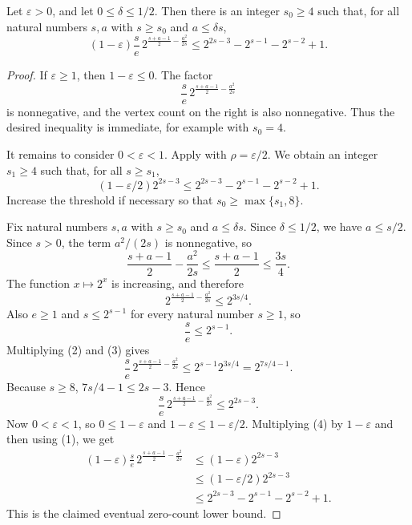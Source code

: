 \begin{helper}
Let \(\varepsilon>0\), and let \(0\le\delta\le1/2\).  Then there is an
integer \(s_0\ge4\) such that, for all natural numbers \(s,a\) with
\(s\ge s_0\) and \(a\le\delta s\),
\[
  (1-\varepsilon)\frac{s}{e}\,
  2^{\frac{s+a-1}{2}-\frac{a^2}{2s}}
  \le
  2^{2s-3}-2^{s-1}-2^{s-2}+1.
\]
\end{helper}
\begin{proof}
If \(\varepsilon\ge1\), then \(1-\varepsilon\le0\).  The factor
\[
  \frac{s}{e}\,
  2^{\frac{s+a-1}{2}-\frac{a^2}{2s}}
\]
is nonnegative, and the vertex count on the right is also nonnegative.  Thus
the desired inequality is immediate, for example with \(s_0=4\).

It remains to consider \(0<\varepsilon<1\).  Apply
 with
\(\rho=\varepsilon/2\).  We obtain an integer \(s_1\ge4\) such that, for
all \(s\ge s_1\),
\[
  (1-\varepsilon/2)2^{2s-3}
  \le
  2^{2s-3}-2^{s-1}-2^{s-2}+1. \tag{1}
\]
Increase the threshold if necessary so that \(s_0\ge \max\{s_1,8\}\).

Fix natural numbers \(s,a\) with \(s\ge s_0\) and \(a\le\delta s\).  Since
\(\delta\le1/2\), we have \(a\le s/2\).  Since \(s>0\), the term
\(a^2/(2s)\) is nonnegative, so
\[
  \frac{s+a-1}{2}-\frac{a^2}{2s}
  \le
  \frac{s+a-1}{2}
  \le
  \frac{3s}{4}.
\]
The function \(x\mapsto2^x\) is increasing, and therefore
\[
  2^{\frac{s+a-1}{2}-\frac{a^2}{2s}}
  \le 2^{3s/4}. \tag{2}
\]
Also \(e\ge1\) and \(s\le2^{s-1}\) for every natural number \(s\ge1\), so
\[
  \frac{s}{e}\le2^{s-1}. \tag{3}
\]
Multiplying (2) and (3) gives
\[
  \frac{s}{e}\,
  2^{\frac{s+a-1}{2}-\frac{a^2}{2s}}
  \le
  2^{s-1}2^{3s/4}
  =
  2^{7s/4-1}.
\]
Because \(s\ge8\), \(7s/4-1\le2s-3\).  Hence
\[
  \frac{s}{e}\,
  2^{\frac{s+a-1}{2}-\frac{a^2}{2s}}
  \le 2^{2s-3}. \tag{4}
\]
Now \(0<\varepsilon<1\), so \(0\le1-\varepsilon\) and
\(1-\varepsilon\le1-\varepsilon/2\).  Multiplying (4) by
\(1-\varepsilon\) and then using (1), we get
\[
\begin{aligned}
  (1-\varepsilon)\frac{s}{e}\,
  2^{\frac{s+a-1}{2}-\frac{a^2}{2s}}
  &\le (1-\varepsilon)2^{2s-3}\\
  &\le (1-\varepsilon/2)2^{2s-3}\\
  &\le 2^{2s-3}-2^{s-1}-2^{s-2}+1.
\end{aligned}
\]
This is the claimed eventual zero-count lower bound.
\end{proof}
